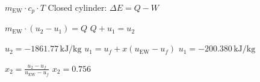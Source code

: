 \( m_{\text{EW}} \cdot c_p \cdot T \)  
Closed cylinder:  
\( \Delta E = Q - W \)  

\( m_{\text{EW}} \cdot (u_2 - u_1) = Q \)  
\( Q + u_1 = u_2 \)  

\( u_2 = -1861.77 \, \text{kJ/kg} \)  
\( u_1 = u_f + x(u_{\text{EW}} - u_f) \)  
\( u_1 = -200.380 \, \text{kJ/kg} \)  

\( x_2 = \frac{u_2 - u_f}{u_{\text{EW}} - u_f} \)  
\( x_2 = 0.756 \)